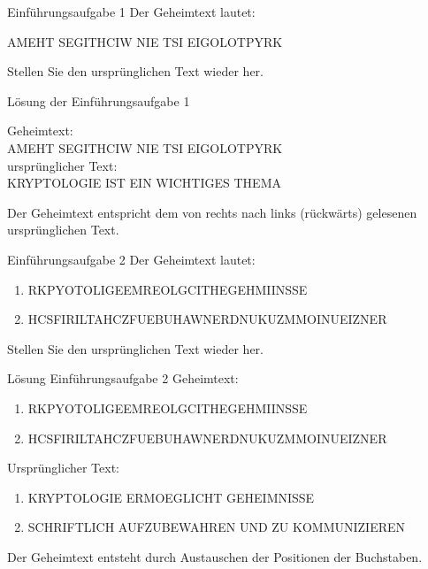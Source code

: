 
\begin{frame}[label=intro1]{Einführungsaufgabe 1}
   Der Geheimtext lautet:
   \begin{center}
       AMEHT SEGITHCIW NIE TSI EIGOLOTPYRK
   \end{center}
   Stellen Sie den ursprünglichen Text wieder her.
\end{frame}

\begin{frame}[label=intro1Sol]{Lösung der Einführungsaufgabe 1}
   \begin{center}
   
       Geheimtext:\\
       AMEHT SEGITHCIW NIE TSI EIGOLOTPYRK\\
       \bigskip
       ursprünglicher Text:\\
       KRYPTOLOGIE IST EIN WICHTIGES THEMA\\
   \end{center}
   Der Geheimtext entspricht dem von rechts nach links (rückwärts) gelesenen ursprünglichen Text.
\end{frame}

\begin{frame}[label=intro2]{Einführungsaufgabe 2}
   Der Geheimtext lautet:
   \begin{center}
   \small
       \begin{enumerate}
           \item RKPYOTOLIGEEMREOLGCITHEGEHMIINSSE
           \item HCSFIRILTAHCZFUEBUHAWNERDNUKUZMMOINUEIZNER
       \end{enumerate}
       \normalsize
   \end{center}
   Stellen Sie den ursprünglichen Text wieder her.
\end{frame}

\begin{frame}[label=intro2Sol]{Lösung Einführungsaufgabe 2}
   Geheimtext:
   \begin{center}
   \small
       \begin{enumerate}
           \item RKPYOTOLIGEEMREOLGCITHEGEHMIINSSE
           \item HCSFIRILTAHCZFUEBUHAWNERDNUKUZMMOINUEIZNER
       \end{enumerate}
       \normalsize
   \end{center}
   Ursprünglicher Text:
   \begin{center}
   \small
       \begin{enumerate}
           \item KRYPTOLOGIE ERMOEGLICHT GEHEIMNISSE
           \item SCHRIFTLICH AUFZUBEWAHREN UND ZU KOMMUNIZIEREN
       \end{enumerate}
       \normalsize
   \end{center}
   Der Geheimtext entsteht durch Austauschen der Positionen der Buchstaben.
\end{frame}

